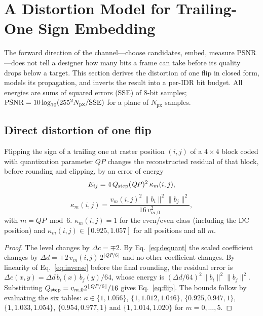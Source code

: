 \section{A Distortion Model for Trailing-One Sign Embedding}
\label{sec:distortion}

The forward direction of the channel---choose candidates, embed, measure PSNR---does not tell a designer how many bits a frame can take before its quality drops below a target. This section derives the distortion of one flip in closed form, models its propagation, and inverts the result into a per-IDR bit budget. All energies are sums of squared errors (SSE) of 8-bit samples; $\mathrm{PSNR}=10\log_{10}(255^2 N_{\mathrm{px}}/\mathrm{SSE})$ for a plane of $N_{\mathrm{px}}$ samples.

\subsection{Direct distortion of one flip}

\begin{lemma}
\label{lem:flip}
Flipping the sign of a trailing one at raster position $(i,j)$ of a $4\times4$ block coded with quantization parameter $\mathit{QP}$ changes the reconstructed residual of that block, before rounding and clipping, by an error of energy
\begin{equation}
E_{ij}=4\,Q_{\mathrm{step}}(\mathit{QP})^2\,\kappa_m(i,j),
\label{eq:flip}
\end{equation}
\begin{equation}
\kappa_m(i,j)=\frac{v_m(i,j)^2\,\|b_i\|^2\|b_j\|^2}{16\,v_{m,0}^2},
\label{eq:kappa}
\end{equation}
with $m=\mathit{QP}\bmod6$. $\kappa_m(i,j)=1$ for the even/even class (including the DC position) and $\kappa_m(i,j)\in[0.925,1.057]$ for all positions and all $m$.
\end{lemma}
\begin{proof}
The level changes by $\Delta c=\mp2$. By Eq.~\eqref{eq:dequant} the scaled coefficient changes by $\Delta d=\mp2\,v_m(i,j)\,2^{\lfloor\mathit{QP}/6\rfloor}$ and no other coefficient changes. By linearity of Eq.~\eqref{eq:inverse} before the final rounding, the residual error is $\Delta e(x,y)=\Delta d\, b_i(x)\,b_j(y)/64$, whose energy is $(\Delta d/64)^2\|b_i\|^2\|b_j\|^2$. Substituting $Q_{\mathrm{step}}=v_{m,0}2^{\lfloor\mathit{QP}/6\rfloor}/16$ gives Eq.~\eqref{eq:flip}. The bounds follow by evaluating the six tables: $\kappa\in\{1,1.056\}$, $\{1,1.012,1.046\}$, $\{0.925,0.947,1\}$, $\{1,1.033,1.054\}$, $\{0.954,0.977,1\}$ and $\{1,1.014,1.020\}$ for $m=0,\dots,5$.
\end{proof}

